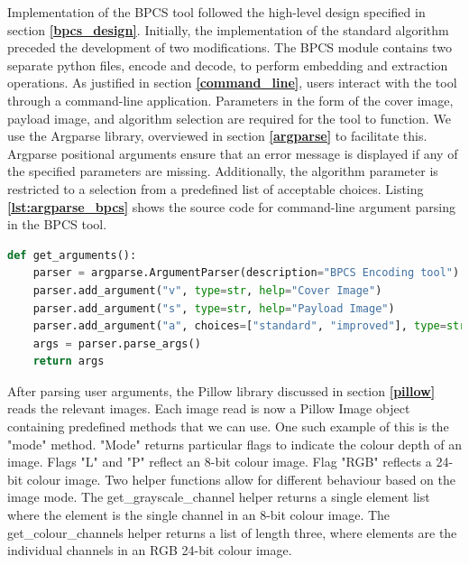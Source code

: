 \documentclass{l4proj}
\begin{document}
Implementation of the BPCS tool followed the high-level design specified in section \textbf{\ref{bpcs_design}}. Initially, the implementation of the standard algorithm preceded the development of two modifications. The BPCS module contains two separate python files, encode and decode, to perform embedding and extraction operations.  As justified in section \textbf{\ref{command_line}}, users interact with the tool through a command-line application. Parameters in the form of the cover image, payload image, and algorithm selection are required for the tool to function. We use the Argparse library, overviewed in section \textbf{\ref{argparse}} to facilitate this. Argparse positional arguments ensure that an error message is displayed if any of the specified parameters are missing. Additionally, the algorithm parameter is restricted to a selection from a predefined list of acceptable choices. Listing \textbf{\ref{lst:argparse_bpcs}} shows the source code for command-line argument parsing in the BPCS tool. 

\begin{lstlisting}[language=python, float, caption={Command-line argument parsing using the Argparse library. Cover, payload and algorithm selection specified as positional arguments. Algorithm selection restricted to a choice from a set of predefined options.}, label=lst:argparse_bpcs]
    def get_arguments():
    parser = argparse.ArgumentParser(description="BPCS Encoding tool")
    parser.add_argument("v", type=str, help="Cover Image")
    parser.add_argument("s", type=str, help="Payload Image")
    parser.add_argument("a", choices=["standard", "improved"], type=str, help="Algorithm. Standard or Improved")
    args = parser.parse_args()
    return args
\end{lstlisting}

After parsing user arguments, the Pillow library discussed in section \textbf{\ref{pillow}} reads the relevant images. Each image read is now a Pillow Image object containing predefined methods that we can use. One such example of this is the "mode" method. "Mode" returns particular flags to indicate the colour depth of an image. Flags "L" and "P" reflect an 8-bit colour image. Flag "RGB" reflects a 24-bit colour image. Two helper functions allow for different behaviour based on the image mode. The get\_grayscale\_channel helper returns a single element list where the element is the single channel in an 8-bit colour image. The get\_colour\_channels helper returns a list of length three, where elements are the individual channels in an RGB 24-bit colour image.
\end{document}
